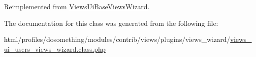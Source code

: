 Reimplemented from \hyperlink{classViewsUiBaseViewsWizard_a862c9e72a5e11fd78baa1992581f1410}{ViewsUiBaseViewsWizard}.

The documentation for this class was generated from the following file:\begin{DoxyCompactItemize}
\item 
html/profiles/dosomething/modules/contrib/views/plugins/views\_\-wizard/\hyperlink{views__ui__users__views__wizard_8class_8php}{views\_\-ui\_\-users\_\-views\_\-wizard.class.php}\end{DoxyCompactItemize}

